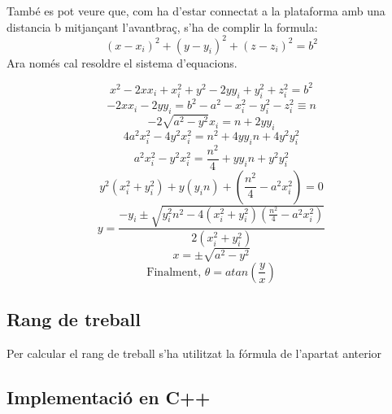 També es pot veure que, com ha d'estar connectat a la plataforma amb una distancia b mitjançant l'avantbraç, s'ha de complir la formula: \[(x-x_i)^2+(y-y_i)^2+(z-z_i)^2=b^2\]
Ara només cal resoldre el sistema d'equacions.

\[x^2-2xx_i+x_i^2+y^2-2yy_i+y_i^2+z_i^2=b^2\]
\[-2xx_i-2yy_i=b^2-a^2-x_i^2-y_i^2-z_i^2\equiv n\]
\[-2\sqrt{a^2-y^2}x_i=n+2yy_i\]
\[4a^2x_i^2-4y^2x_i^2=n^2+4yy_in+4y^2y_i^2\]
\[a^2x_i^2-y^2x_i^2=\frac{n^2}{4}+yy_in+y^2y_i^2\]
\[y^2(x_i^2+y_i^2)+y(y_in)+(\frac{n^2}{4}-a^2x_i^2)=0\]
\[y=\frac{-y_i\pm\sqrt{y_i^2n^2-4(x_i^2+y_i^2)(\frac{n^2}{4}-a^2x_i^2)}}{2(x_i^2+y_i^2)}\]
\[x=\pm\sqrt{a^2-y^2}\]
\[\textrm{Finalment, }\theta=atan(\frac{y}{x})\]

\subsection{Rang de treball}

Per calcular el rang de treball s'ha utilitzat la fórmula de l'apartat anterior  

\subsection{Implementació en C++}